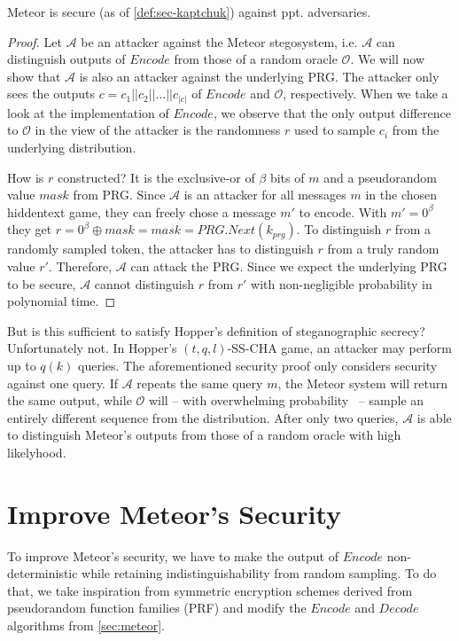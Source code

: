 \begin{theorem}
	Meteor is secure (as of \autoref{def:sec-kaptchuk}) against ppt. adversaries. 
\end{theorem}
\begin{proof}
	Let $\mathcal{A}$ be an attacker against the Meteor stegosystem, i.e. $\mathcal{A}$ can distinguish outputs of $Encode$ from those of a random oracle $\mathcal{O}$. 
	We will now show that $\mathcal{A}$ is also an attacker against the underlying PRG.
	The attacker only sees the outputs $c = c_1 ||c_2 || \dots || c_{|c|}$ of $Encode$ and $\mathcal{O}$, respectively. 
	When we take a look at the implementation of $Encode$, we observe that the only output difference to $\mathcal{O}$ in the view of the attacker is the randomness $r$ used to sample $c_i$ from the underlying distribution.
	
	How is $r$ constructed? 
	It is the exclusive-or of $\beta$ bits of $m$ and a pseudorandom value $mask$ from PRG.
	Since $\mathcal{A}$ is an attacker for all messages $m$ in the chosen hiddentext game, they can freely chose a message $m'$ to encode.
	With $m' = 0^\beta$ they get $r = 0^\beta \oplus mask = mask = PRG.Next(k_{prg})$.
	To distinguish $r$ from a randomly sampled token, the attacker has to distinguish $r$ from a truly random value $r'$.
	Therefore, $\mathcal{A}$ can attack the PRG.
	Since we expect the underlying PRG to be secure, $\mathcal{A}$ cannot distinguish $r$ from $r'$ with non-negligible probability in polynomial time.
\end{proof}

But is this sufficient to satisfy Hopper's definition of steganographic secrecy?
Unfortunately not.
In Hopper's $(t,q,l)$-SS-CHA game, an attacker may perform up to $q(k)$ queries.
The aforementioned security proof only considers security against one query.
If $\mathcal{A}$ repeats the same query $m$, the Meteor system will return the same output, while $\mathcal{O}$ will -- with overwhelming probability~ -- sample an entirely different sequence from the distribution.
After only two queries, $\mathcal{A}$ is able to distinguish Meteor's outputs from those of a random oracle with high likelyhood.

\section{Improve Meteor's Security}

To improve Meteor's security, we have to make the output of $Encode$ non-deterministic while retaining indistinguishability from random sampling.
To do that, we take inspiration from symmetric encryption schemes derived from pseudorandom function families (PRF) and modify the $Encode$ and $Decode$ algorithms from \autoref{sec:meteor}. 

